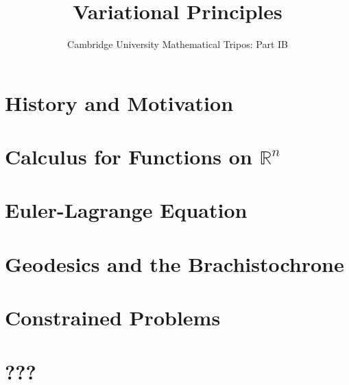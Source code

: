 \documentclass{article}
\title{Variational Principles}
\author{Cambridge University Mathematical Tripos: Part IB}
\begin{document}
\maketitle

\tableofcontentsnewpage{}

\section{History and Motivation}

\section{Calculus for Functions on \(\mathbb R^n\)}

\section{Euler-Lagrange Equation}

\section{Geodesics and the Brachistochrone}

\section{Constrained Problems}

\section{???}

\end{document}
